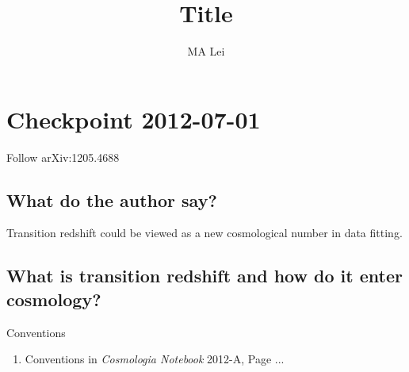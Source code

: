 \documentclass[12pt,a4paper]{article}
\begin{document}
\title{Title}
\author{MA Lei}

\newcommand{\dd}{\mathrm d}
\newcommand{\HH}{\mathcal H}
\newcommand{\CN}{{\it Cosmologia Notebook}}
\newenvironment{eqnset}
{\begin{equation}\left \bracevert \begin{array}{l}}
{\end{array} \right. \end{equation}}

\newenvironment{eqn}
{\begin{equation}\left \bracevert \begin{array}{l}}
{\end{array} \right. \end{equation}}










\section{Checkpoint 2012-07-01}

Follow arXiv:1205.4688

\subsection{What do the author say?}

Transition redshift could be viewed as a new cosmological number in data fitting.

\subsection{What is transition redshift and how do it enter cosmology?}


Conventions
\begin{enumerate}
\item
Conventions in {\CN} 2012-A, Page ...
\end{enumerate}
\end{document}
